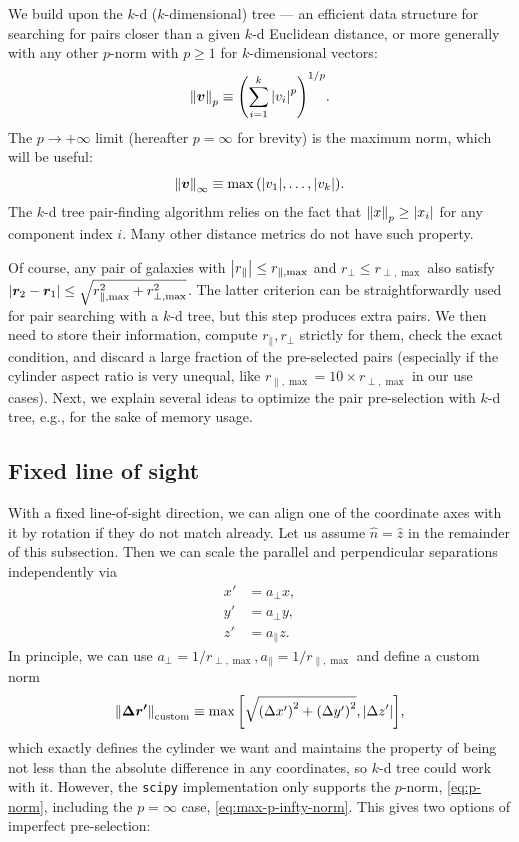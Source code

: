 We build upon the $k$-d ($k$-dimensional) tree --- an efficient data structure for searching for pairs closer than a given $k$-d Euclidean distance, or more generally with any other $p$-norm with $p\ge 1$ for $k$-dimensional vectors:
\begin{equation}
    \norm{\bm{v}}_p \equiv \qty(\sum_{i=1}^k \abs{v_i}^p)^{1/p}. \label{eq:p-norm}
\end{equation}
The $p\rightarrow +\infty$ limit (hereafter $p=\infty$ for brevity) is the maximum norm, which will be useful:
\begin{equation}
    \norm{\bm{v}}_\infty \equiv \max\qty(\abs{v_1}, \dots, \abs{v_k}). \label{eq:max-p-infty-norm}
\end{equation}
The $k$-d tree pair-finding algorithm relies on the fact that $\norm{x}_p \ge \abs{x_i}$ for any component index $i$.
Many other distance metrics do not have such property.

Of course, any pair of galaxies with $\abs{r_{\parallel}} \le r_{\parallel,\max}$ and $r_\perp \le r_{\perp,\max}$ also satisfy $\abs{\bm{r}_2 - \bm{r}_1} \le \sqrt{r_{\parallel,\max}^2 + r_{\perp,\max}^2}$.
The latter criterion can be straightforwardly used for pair searching with a $k$-d tree, but this step produces extra pairs.
We then need to store their information, compute $r_\parallel, r_\perp$ strictly for them, check the exact condition, and discard a large fraction of the pre-selected pairs (especially if the cylinder aspect ratio is very unequal, like $r_{\parallel,\max} = 10 \times r_{\perp,\max}$ in our use cases).
Next, we explain several ideas to optimize the pair pre-selection with $k$-d tree, e.g., for the sake of memory usage.

\subsection{Fixed line of sight}

With a fixed line-of-sight direction, we can align one of the coordinate axes with it by rotation if they do not match already.
Let us assume $\hat n = \hat z$ in the remainder of this subsection.
Then we can scale the parallel and perpendicular separations independently via
\begin{align}
    x' &= a_\perp x, \\
    y' &= a_\perp y, \\
    z' &= a_\parallel z.
\end{align}
In principle, we can use $a_\perp = 1/r_{\perp,\max},a_\parallel = 1/r_{\parallel,\max}$ and define a custom norm
\begin{equation}
    \norm{\bm{\Delta r'}}_{\rm custom} \equiv \max\qty[\sqrt{\qty(\Delta x')^2 + \qty(\Delta y')^2}, \abs{\Delta z'}],
\end{equation}
which exactly defines the cylinder we want and maintains the property of being not less than the absolute difference in any coordinates, so $k$-d tree could work with it.
However, the {\tt scipy} \citep{2020SciPy-NMeth, scipy_8092679} implementation only supports the $p$-norm, \cref{eq:p-norm}, including the $p=\infty$ case, \cref{eq:max-p-infty-norm}.
This gives two options of imperfect pre-selection:

